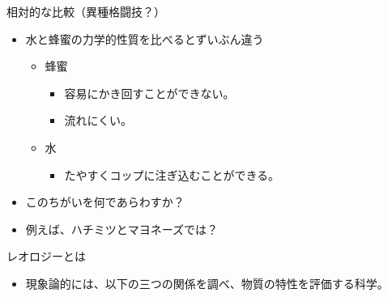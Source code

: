 \begin{frame}

\begin{block}{相対的な比較（異種格闘技？）}

\begin{itemize}
\tightlist
\item
  水と蜂蜜の力学的性質を比べるとずいぶん違う

  \begin{itemize}
  \tightlist
  \item
    蜂蜜

    \begin{itemize}
    \tightlist
    \item
      容易にかき回すことができない。
    \item
      流れにくい。
    \end{itemize}
  \item
    水

    \begin{itemize}
    \tightlist
    \item
      たやすくコップに注ぎ込むことができる。
    \end{itemize}
  \end{itemize}
\item
  このちがいを何であらわすか？
\item
  例えば、ハチミツとマヨネーズでは？
\end{itemize}

\end{block}

\end{frame}

\begin{frame}

\begin{block}{レオロジーとは}

\begin{itemize}
\tightlist
\item
  現象論的には、以下の三つの関係を調べ、物質の特性を評価する科学。
\end{itemize}

\end{block}

\end{frame}

